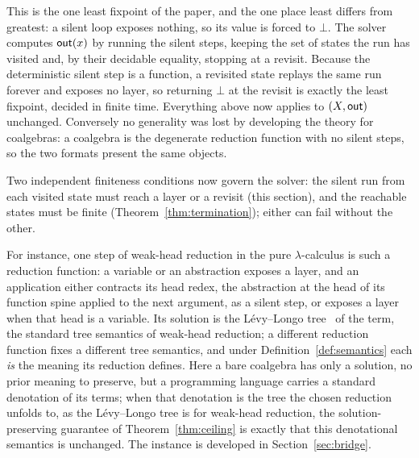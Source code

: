 \noindent This is the one least fixpoint of the paper, and the one place least differs from greatest: a silent loop exposes nothing, so its value is forced to $\bot$. The solver computes $\mathsf{out}(x)$
by running the silent steps, keeping the set of states the run has visited and, by their decidable equality, stopping at a revisit. Because the deterministic silent step is a function, a revisited state replays the same run forever and exposes no layer, so returning $\bot$ at the revisit is exactly the least fixpoint, decided in finite time. Everything above now applies to
$(X, \mathsf{out})$ unchanged. Conversely no generality was lost by developing the theory for coalgebras: a coalgebra is the degenerate reduction function with no silent steps, so the two formats present the same objects.

Two independent finiteness conditions now govern the solver: the silent run from each visited state must reach a layer or a revisit (this section), and the reachable states must be finite
(Theorem~\ref{thm:termination}); either can fail without the other.

For instance, one step of weak-head reduction in the pure $\lambda$-calculus is such a reduction function: a variable or an abstraction exposes a layer, and an application either contracts its head redex, the abstraction at the head of its function spine applied to the next argument, as a silent step, or exposes a layer when that head is a variable. Its solution is the L\'evy--Longo tree~\cite{longo1983-set-theoretical-models} of the term, the standard tree semantics of weak-head reduction; a different reduction function fixes a different tree semantics, and under Definition~\ref{def:semantics} each \emph{is} the meaning its reduction defines. Here a bare coalgebra has only a solution, no prior meaning to preserve, but a programming language carries a standard denotation of its terms; when that denotation is the tree the chosen reduction unfolds to, as the L\'evy--Longo tree is for weak-head reduction, the solution-preserving guarantee of Theorem~\ref{thm:ceiling} is exactly that this denotational semantics is unchanged. The instance is developed in Section~\ref{sec:bridge}.

